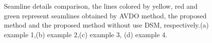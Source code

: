 \documentclass[journal]{IEEEtran}
\begin{document}
\begin{figure}[!t]
    \caption{Seamline details comparison, the lines colored by yellow, red and green represent seamlines obtained by AVDO method, the proposed method and the proposed method without use DSM, respectively.(a) example 1,(b) example 2,(c) example 3, (d) example 4.}
    \label{fig:seamline-details-comparison}
\end{figure}
\end{document}
